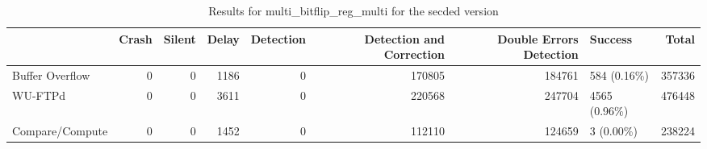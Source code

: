\begin{table}[t]
	\centering
	\caption{Results for multi_bitflip_reg_multi for the secded version}
	\label{table:end_sim_by_status_secded_2_multi_bitflip_reg_multi}
	\begin{tabular}{lrrrrrrlr}
		\toprule
		                & Crash & Silent & Delay & Detection & Detection and Correction & Double Errors Detection & Success       & Total  \\
		\midrule
		Buffer Overflow & 0     & 0      & 1186  & 0         & 170805                   & 184761                  & 584 (0.16\%)  & 357336 \\
		WU-FTPd         & 0     & 0      & 3611  & 0         & 220568                   & 247704                  & 4565 (0.96\%) & 476448 \\
		Compare/Compute & 0     & 0      & 1452  & 0         & 112110                   & 124659                  & 3 (0.00\%)    & 238224 \\
		\bottomrule
	\end{tabular}
\end{table}
